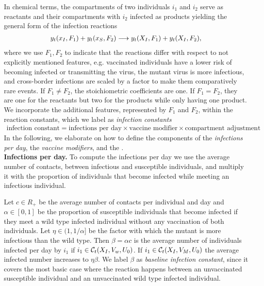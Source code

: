 In chemical terms, the compartments of two individuals $i_1$ and $i_2$ serve as reactants and their compartments with $i_2$ infected as products yielding the general form of the infection reactions
\begin{align}
\label{eq:general_infection}
y_t(x_I, F_1) + y_t(x_S, F_2) \longrightarrow y_t(X_I, F_1) + y_t(X_I, F_2),
\end{align}
where we use $F_1, F_2$ to indicate that the reactions differ with respect to not explicitly mentioned features, e.g. vaccinated individuals have a lower risk of becoming infected or transmitting the virus, the mutant virus is more infectious, and cross-border infections are scaled by a factor to make them comparatively rare events. If $F_1 \neq F_2$, the stoichiometric coefficients are one. If $F_1=F_2$, they are one for the reactants but two for the products while only having one product. We incorporate the additional features, represented by $F_1$ and $F_2$, within the reaction constants, which we label as \textit{infection constants}
\begin{align*}
\text{infection constant} = \text{infections per day} \times \text{vaccine modifier} \times \text{compartment adjustment}
\end{align*}
In the following, we elaborate on how to define the components of the \textit{infections per day}, the \textit{vaccine modifiers}, and the .\\

\textbf{Infections per day.} To compute the infections per day we use the average number of contacts, between infectious and susceptible individuals, and multiply it with the proportion of individuals that become infected while meeting an infectious individual.

Let $c \in R_+$ be the average number of contacts per individual and day and $\alpha \in [0,1]$ be the proportion of susceptible individuals that become infected if they meet a wild type infected individual without any vaccination of both individuals. Let $\eta \in (1, 1/\alpha]$ be the factor with which the mutant is more infectious than the wild type. Then $\beta = \alpha c$ is the average number of individuals infected per day by $i_1$ if $i_1 \in \mathcal{C}_t(X_I, V_w, U_0)$. If $i_1 \in \mathcal{C}_t(X_I, V_M, U_0)$ the average infected number increases to $\eta \beta$. We label $\beta$ as \textit{baseline infection constant}, since it covers the most basic case where the reaction happens between an unvaccinated susceptible individual and an unvaccinated wild type infected individual. \\

